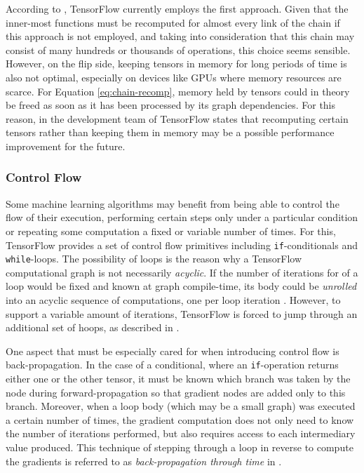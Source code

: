 According to \cite{tensorflow}, TensorFlow currently employs the first
approach. Given that the inner-most functions must be recomputed for almost
every link of the chain if this approach is not employed, and taking into
consideration that this chain may consist of many hundreds or thousands of
operations, this choice seems sensible. However, on the flip side, keeping
tensors in memory for long periods of time is also not optimal, especially on
devices like GPUs where memory resources are scarce. For Equation
\ref{eq:chain-recomp}, memory held by tensors could in theory be freed as soon
as it has been processed by its graph dependencies. For this reason, in
\cite{tensorflow} the development team of TensorFlow states that recomputing
certain tensors rather than keeping them in memory may be a possible performance
improvement for the future.

\subsubsection{Control Flow}\label{sec:model-ext-flow}

Some machine learning algorithms may benefit from being able to control the flow
of their execution, performing certain steps only under a particular condition
or repeating some computation a fixed or variable number of times. For this,
TensorFlow provides a set of control flow primitives including
\texttt{if}-conditionals and \texttt{while}-loops. The possibility of loops is
the reason why a TensorFlow computational graph is not necessarily
\emph{acyclic}. If the number of iterations for of a loop would be fixed and
known at graph compile-time, its body could be \emph{unrolled} into an acyclic
sequence of computations, one per loop iteration \cite{theano}. However, to
support a variable amount of iterations, TensorFlow is forced to jump through an
additional set of hoops, as described in \cite{tensorflow}.

One aspect that must be especially cared for when introducing control flow is
back-propagation. In the case of a conditional, where an \texttt{if}-operation
returns either one or the other tensor, it must be known which branch was taken
by the node during forward-propagation so that gradient nodes are added only to
this branch. Moreover, when a loop body (which may be a small graph) was
executed a certain number of times, the gradient computation does not only need
to know the number of iterations performed, but also requires access to each
intermediary value produced. This technique of stepping through a loop in
reverse to compute the gradients is referred to as \emph{back-propagation
  through time} in \cite{theano}.

